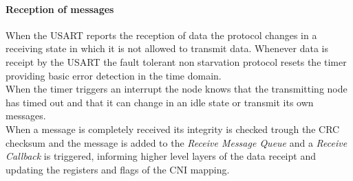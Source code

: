 \paragraph{Reception of messages}
When the USART reports the reception of data the protocol changes in a receiving state in which it is not allowed to transmit data.
Whenever data is receipt by the USART the fault tolerant non starvation protocol resets the timer providing basic error detection in the time domain.\\

When the timer triggers an interrupt the node knows that the transmitting node has timed out and that it can change in an idle state or transmit its own messages.\\

When a message is completely received its integrity is checked trough the CRC checksum and the message is added to the \textit{Receive Message Queue} and a \textit{Receive Callback} is triggered, informing higher level layers of the data receipt and updating the registers and flags of the CNI mapping.

%